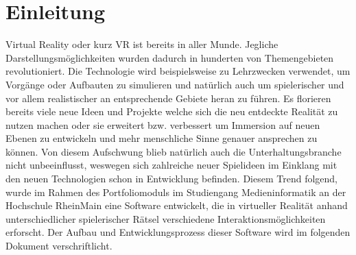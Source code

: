 \chapter{Einleitung}
Virtual Reality oder kurz \dq VR \dq ist bereits in aller Munde. Jegliche Darstellungsmöglichkeiten wurden dadurch in hunderten von Themengebieten revolutioniert. Die Technologie wird beispielsweise zu Lehrzwecken verwendet, um Vorgänge oder Aufbauten zu simulieren und natürlich auch um spielerischer und vor allem realistischer an entsprechende Gebiete heran zu führen. Es florieren bereits viele neue Ideen und Projekte welche sich die neu entdeckte Realität zu nutzen machen oder sie erweitert bzw. verbessert um Immersion auf neuen  Ebenen zu entwickeln und mehr menschliche Sinne genauer ansprechen zu können. Von diesem Aufschwung blieb natürlich auch die Unterhaltungsbranche nicht unbeeinflusst, weswegen sich zahlreiche neuer Spielideen im Einklang mit den neuen Technologien schon in Entwicklung befinden. Diesem Trend folgend, wurde im Rahmen des Portfoliomoduls im Studiengang Medieninformatik an der Hochschule RheinMain eine Software entwickelt, die in virtueller Realität anhand unterschiedlicher spielerischer Rätsel verschiedene Interaktionsmöglichkeiten erforscht. Der Aufbau und Entwicklungsprozess dieser Software wird im folgenden Dokument verschriftlicht.